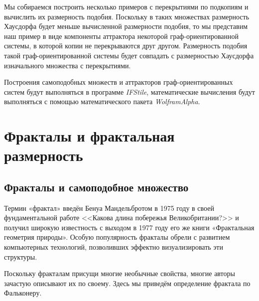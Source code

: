 \documentclass[a4paper,14pt]{extarticle} %
\newcommand{\0}{\varnothing}
\newcommand{\8}{\infty}
\theoremstyle{definition}
\begin{document}
Мы собираемся построить несколько примеров с перекрытиями по подкопиям и вычислить их размерность подобия.
Поскольку в таких множествах размерность Хаусдорфа будет меньше вычисленной размерности подобия, то мы представим наш пример в виде компоненты аттрактора некоторой граф-ориентированной системы, в которой копии не перекрываются друг другом.
Размерность подобия такой граф-ори\-ен\-ти\-ро\-ван\-ной системы будет совпадать с размерностью Хаусдорфа изначального множества с перекрытиями.

Построения самоподобных множеств и аттракторов граф-ори\-ен\-ти\-ро\-ван\-ных систем будут выполняться в программе {\em IFStile\/}, математические вычисления будут выполняться с помощью математического пакета {\em WolframAlpha}.



\newpage
\section{Фракталы и фрактальная размерность}

\subsection{Фракталы и самоподобное множество}

Термин «фрактал» введён Бенуа Мандельбротом в 1975 году в своей фундаментальной работе <<Какова длина побережья Великобритании?>> и получил широкую известность с выходом в 1977 году его же книги «Фрактальная геометрия природы». 
Особую популярность фракталы обрели с развитием компьютерных технологий, позволивших эффектно визуализировать эти структуры. 

Поскольку фракталам присущи многие необычные свойства, многие авторы зачастую описывают их по своему. 
Здесь мы приведём определение фрактала по Фальконеру.
\end{document}
